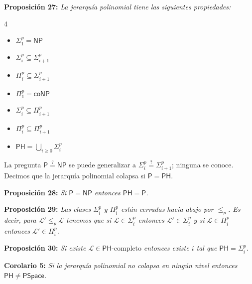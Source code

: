 \documentclass{article}
\begin{document}
\begin{flushleft}
  \textbf{Proposición 27:}
  \textit{La jerarquía polinomial tiene las siguientes propiedades:}
\end{flushleft}
\begin{multicols}{4}
  \begin{itemize}
    \item $\Sigma^p_1 = \mathsf{NP}$
    \item $\Sigma^p_i \subseteq \Sigma^p_{i+1}$
    \item $\Pi^p_i \subseteq \Sigma^p_{i+1}$
    \item $\Pi^p_1 = \mathsf{coNP}$
    \item $\Sigma^p_i \subseteq \Pi^p_{i+1}$
    \item $\Pi^p_i \subseteq \Pi^p_{i+1}$
    \item $\mathsf{PH} = \bigcup_{i \geq 0} \Sigma^p_{i}$
  \end{itemize}
\end{multicols}
\begin{flushleft}
  La pregunta $\mathsf{P} \stackrel{?}{=} \mathsf{NP}$ se puede generalizar a $\Sigma^p_i \stackrel{?}{=} 
  \Sigma^p_{i+1}$; ninguna se conoce. Decimos que la jerarquía polinomial colapsa si $\mathsf{P} = \mathsf{PH}$.
\end{flushleft}

\begin{flushleft}
  \textbf{Proposición 28:}
  \textit{Si $\mathsf{P} = \mathsf{NP}$ entonces $\mathsf{PH} = \mathsf{P}$.}
\end{flushleft}

\begin{flushleft}
  \textbf{Proposición 29:}
  \textit{Las clases $\Sigma^p_i$ y $\Pi^p_i$ están cerradas hacia abajo por $\leq_p$. Es decir, para $
  \mathcal{L}' \leq_p \mathcal{L}$ tenemos que si $\mathcal{L} \in \Sigma^p_i$ entonces $\mathcal{L}' \in 
  \Sigma^p_i$ y si $\mathcal{L} \in \Pi^p_i$ entonces $\mathcal{L}' \in \Pi^p_i$.}
\end{flushleft}

\begin{flushleft}
  \textbf{Proposición 30:}
  \textit{Si existe $\mathcal{L} \in \mathsf{PH}$}-completo \textit{entonces existe $i$ tal que $\mathsf{PH}
  = \Sigma^p_i$.}
\end{flushleft}

\begin{flushleft}
  \textbf{Corolario 5:}
  \textit{Si la jerarquía polinomial no colapsa en ningún nivel entonces $\mathsf{PH} \neq \mathsf{PSpace}$.}
\end{flushleft}
\end{document}
